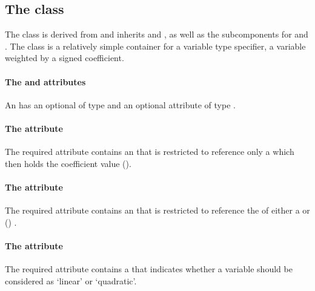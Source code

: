 
\subsection{The \FBC {} class}
\label{userconstraintcomponent-class}

The \FBC \UserConstraintComponent class is derived from \SBML \SBase and inherits
 and , as well as the subcomponents for
\Annotation and \Notes. The \UserConstraintComponent class is a relatively simple container for a variable type specifier, a variable weighted by a signed coefficient.

\paragraph{The  and  attributes}
An \UserConstraintComponent has an optional  of type  and an optional attribute  of type .

\paragraph{The  attribute}
The required  attribute contains an  that is restricted to reference only a \Parameter which then holds the coefficient value ().

\paragraph{The  attribute}
The required  attribute contains an  that is restricted to reference the  of either a \Reaction or () \Parameter.

\paragraph{The  attribute}
The required  attribute contains a  that indicates whether a variable should be considered as `linear' or `quadratic'.

